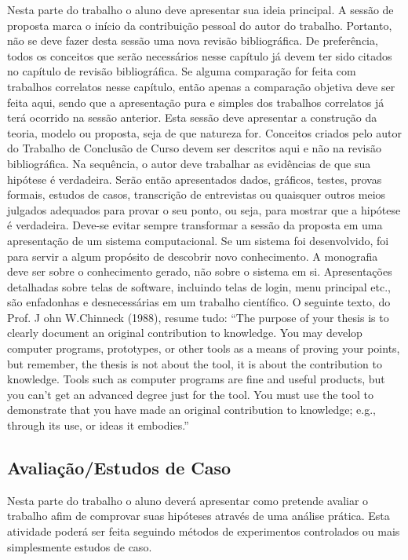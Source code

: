 \documentclass[
	article,			%
	11pt,				%
	oneside,			%
	a4paper,			%
	english,			%
	brazil,				%
	sumario=tradicional
	]{abntex2}
\begin{document}
Nesta parte do trabalho o aluno deve apresentar sua ideia principal.
A sessão de proposta marca o início da contribuição pessoal do autor do trabalho. Portanto, não se deve fazer desta sessão uma nova revisão bibliográfica. De preferência, todos os conceitos que serão necessários nesse capítulo já devem ter sido citados no capítulo de revisão bibliográfica. Se alguma comparação for feita com trabalhos correlatos nesse capítulo, então apenas a comparação objetiva deve ser feita
aqui, sendo que a apresentação pura e simples dos trabalhos correlatos já terá ocorrido na sessão anterior.
Esta sessão deve apresentar a construção da teoria, modelo ou proposta, seja de que
natureza for. Conceitos criados pelo autor do Trabalho de Conclusão de Curso devem ser descritos aqui e não na revisão
bibliográfica. Na sequência, o autor deve trabalhar as evidências de que sua hipótese é verdadeira. Serão então
apresentados dados, gráficos, testes, provas formais, estudos de casos, transcrição de entrevistas ou quaisquer
outros meios julgados adequados para provar o seu ponto, ou seja, para mostrar que a hipótese é verdadeira.
Deve-se evitar sempre transformar a sessão da proposta em uma apresentação de um sistema
computacional. Se um sistema foi desenvolvido, foi para servir a algum propósito de descobrir novo
conhecimento. A monografia deve ser sobre o conhecimento gerado, não sobre o sistema em si. Apresentações
detalhadas sobre telas de software, incluindo telas de login, menu principal etc., são enfadonhas e
desnecessárias em um trabalho científico. O seguinte texto, do Prof. J ohn W.Chinneck (1988), resume tudo:
“The purpose of your thesis is to clearly document an original contribution to knowledge. You may develop computer
programs, prototypes, or other tools as a means of proving your points, but remember, the thesis is not about the tool, it is
about the contribution to knowledge. Tools such as computer programs are fine and useful products, but you can’t get an
advanced degree just for the tool. You must use the tool to demonstrate that you have made an original contribution to
knowledge; e.g., through its use, or ideas it embodies.”

\subsection{Avaliação/Estudos de Caso}

Nesta parte do trabalho o aluno deverá apresentar como pretende avaliar o trabalho afim de comprovar suas hipóteses através de uma análise prática. 
Esta atividade poderá ser feita seguindo métodos de experimentos controlados ou mais simplesmente estudos de caso.
\end{document}
